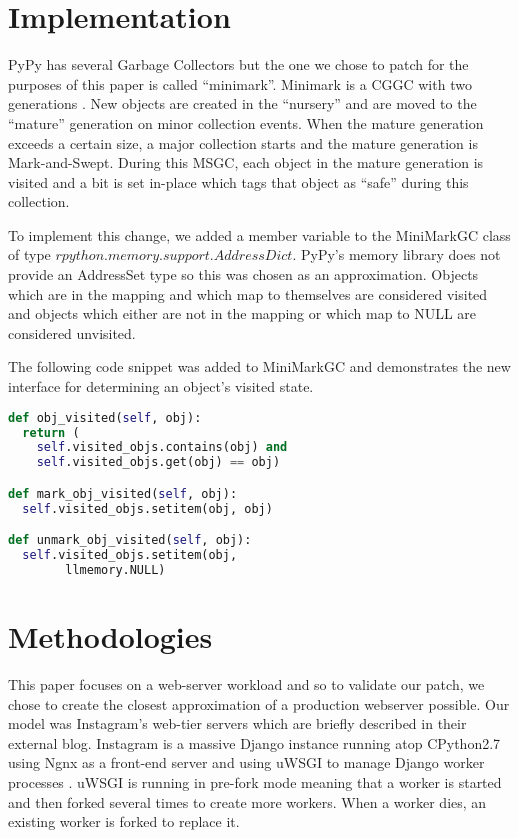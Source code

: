 \documentclass{article}
\begin{document}
\section{Implementation}\label{sec:implementation}

PyPy has several Garbage Collectors but the one we chose to patch for the purposes of this paper is called ``minimark''.  Minimark is a CGGC with two generations \cite{pypy-doc}.  New objects are created in the ``nursery'' and are moved to the ``mature'' generation on minor collection events.  When the mature generation exceeds a certain size, a major collection starts and the mature generation is Mark-and-Swept.  During this MSGC, each object in the mature generation is visited and a bit is set in-place which tags that object as ``safe'' during this collection.  

To implement this change, we added a member variable to the MiniMarkGC class of type $rpython.memory.support.AddressDict$.  PyPy's memory library does not provide an AddressSet type so this was chosen as an approximation.  Objects which are in the mapping and which map to themselves are considered visited and objects which either are not in the mapping or which map to NULL are considered unvisited.  

The following code snippet was added to MiniMarkGC and demonstrates the new interface for determining an object's visited state.

\begin{lstlisting}[language=python]
def obj_visited(self, obj):
  return (
    self.visited_objs.contains(obj) and
    self.visited_objs.get(obj) == obj)

def mark_obj_visited(self, obj):
  self.visited_objs.setitem(obj, obj)

def unmark_obj_visited(self, obj):
  self.visited_objs.setitem(obj,
        llmemory.NULL)
\end{lstlisting}

\section{Methodologies}\label{sec:method}

This paper focuses on a web-server workload and so to validate our patch, we chose to create the closest approximation of a production webserver possible.  Our model was Instagram's web-tier servers which are briefly described in their external blog.  Instagram is a massive Django instance running atop CPython2.7 using Ngnx as a front-end server and using uWSGI to manage Django worker processes \cite{dismissing_garbage}.  uWSGI is running in pre-fork mode meaning that a worker is started and then forked several times to create more workers.  When a worker dies, an existing worker is forked to replace it.  
\end{document}
